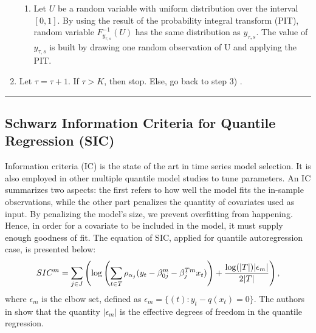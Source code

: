 \begin{enumerate}
\begin{enumerate}
		\item Let $U$ be a random variable with uniform distribution over the interval $[0,1]$. By using the result of the probability integral transform (PIT), random variable $F^{-1}_{y_{\tau,s}}(U)$ has the same distribution as $y_{\tau,s}$. The value of $y_{\tau,s}$ is built by drawing one random observation of U and applying the PIT. 



		 \end{enumerate}
	
	
	\item Let $\tau = \tau + 1$. If $\tau > K$, then stop. Else, go back to step 3) . 


\end{enumerate}

\noindent\rule{\columnwidth}{1pt}


\subsection{Schwarz Information Criteria for Quantile Regression (SIC)} \label{sec:SIC}

Information criteria (IC) is the state of the art in time series model selection. It is also employed in other multiple quantile model studies \cite{zou_regularized_2008, jiang_interquantile_2014} to tune parameters.
An IC summarizes two aspects: the first refers to how well the model fits the in-sample observations, while the other part penalizes the quantity of covariates used as input.
By penalizing the model's size, we prevent overfitting from happening. Hence, in order for a covariate to be included in the model, it must supply enough goodness of fit.
The equation of SIC, applied for quantile autoregression case, is presented below:
 \begin{equation} 
\small
SIC^m = \sum_{j \in J} \left( \log \left(\sum_{t \in T}\rho_{\alpha_j}(y_t - \beta_{0j}^m - \beta_j^{Tm} x_t) \right) +  \frac{\log(|T|)|\epsilon_m|}{2|T|}  \right),\label{eq:SIC}
\end{equation}
where $\epsilon_m$ is the elbow set, defined as $\epsilon_m = \{(t): y_t - q(x_t) = 0 \}$. The authors in \cite{li_l1-norm_2008} show that the quantity $|\epsilon_m|$ is the effective degrees of freedom in the quantile regression.





